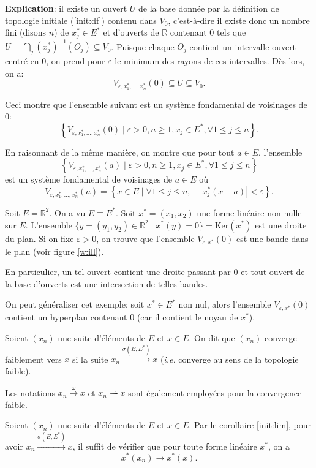 \textbf{Explication}: il existe un ouvert $U$ de la base
donnée par la définition de topologie initiale (\ref{init:df})
contenu dans $V_0$, c'est-à-dire
il existe donc un nombre fini (disons $n$) de $x_j^*\in E^*$ et d'ouverts de
$\mathbb R$ contenant $0$ tels que
$U=\bigcap_{j}(x_j^*)^{-1}(O_j)\subseteq V_0$.
Puisque chaque $O_j$ contient un intervalle ouvert centré
en $0$,
on prend pour $\varepsilon$ le minimum des rayons de ces intervalles.
Dès lors, on a:
$$V_{\varepsilon, x_1^*, \ldots, x_n^*}(0)\subseteq U \subseteq V_0.$$

Ceci montre que l'ensemble suivant est un système fondamental
de voisinages de $0$:
$$\left\{V_{\varepsilon, x_1^*, \ldots, x_n^*}(0)\mid \varepsilon > 0,
  n\geq 1, x_j\in E^*, \forall 1\leq j\leq n\right\}. $$

En raisonnant de la même manière, on montre que pour tout $a\in E$,
l'ensemble
$$\left\{V_{\varepsilon, x_1^*, \ldots, x_n^*}(a)\mid \varepsilon > 0,
  n\geq 1, x_j\in E^*, \forall 1\leq j\leq n\right\}$$
est un système fondamental de voisinages de $a\in E$
où $$V_{\varepsilon, x_1^*, \ldots, x_n^*}(a) =
   \left\{ x\in E\mid \forall 1\leq j\leq n,\quad
    |x_j^*(x-a)| < \varepsilon\right\}.$$


\begin{ex}
  Soit $E = \mathbb R^2$. On a vu $E \equiv E^*$.
  Soit $x^*=(x_1, x_2)$ une forme linéaire non nulle sur $E$. L'ensemble
  $\{y = (y_1, y_2)\in \mathbb R^2\mid x^*(y)=0\} = \mathrm{Ker}(x^*)$
  est une droite du plan. Si on fixe $\varepsilon > 0$, on trouve
  que l'ensemble $V_{\varepsilon, x^*}(0)$ est une \og bande\fg{} dans le plan
  (voir figure \ref{w:ill}).

  En particulier, un tel ouvert contient une droite passant par $0$ et
  tout ouvert de la base d'ouverts est une intersection de telles bandes.
\end{ex}

On peut généraliser cet exemple: soit $x^*\in E^*$
non nul, alors l'ensemble $V_{\varepsilon, x^*}(0)$ contient un hyperplan
contenant $0$ (car il contient le noyau de $x^*$).

\begin{df}
  Soient $(x_n)$ une suite d'éléments de $E$ et $x\in E$.
  On dit que $(x_n)$ converge faiblement vers $x$ si la suite
  $x_n\xrightarrow{\sigma(E, E^*)}x$ (\emph{i.e.} converge au sens de la topologie
  faible).

  Les notations $x_n\xrightarrow{\omega}x$ et $x_n\rightharpoonup x$ sont
  également employées pour la convergence faible.
\end{df}
\begin{lem}
  Soient $(x_n)$ une suite d'éléments de $E$ et $x\in E$.
  Par le corollaire \ref{init:lim}, pour avoir
  $x_n\xrightarrow{\sigma(E, E^*)}x$,  il suffit de vérifier que pour
  toute forme linéaire $x^*$, on a $$x^*(x_n)\to x^*(x).$$
\end{lem}

